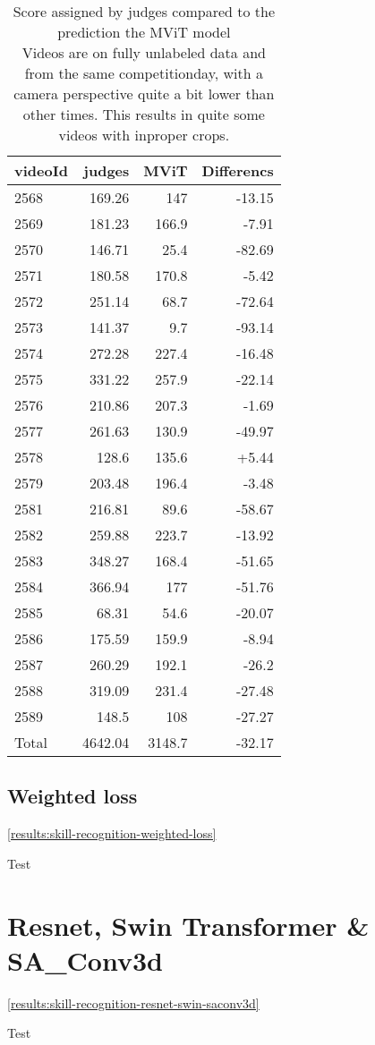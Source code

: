 \begin{table}[h!]
    \begin{tabular}{|l|r|r|r|}
        \hline
        videoId & judges    & MViT         & Differencs \\ \hline
        2568	& 169.26	&   147	       & -13.15 \\
        2569	& 181.23	&   166.9	   & -7.91  \\
        2570	& 146.71	&   25.4	   & -82.69 \\
        2571	& 180.58	&   170.8	   & -5.42  \\
        2572	& 251.14	&   68.7       & -72.64 \\
        2573	& 141.37	&   9.7	       & -93.14 \\
        2574	& 272.28	&   227.4	   & -16.48 \\
        2575	& 331.22	&   257.9	   & -22.14 \\
        2576	& 210.86	&   207.3	   & -1.69  \\
        2577	& 261.63	&   130.9	   & -49.97 \\
        2578	& 128.6	    &   135.6	   & +5.44  \\
        2579	& 203.48	&   196.4	   & -3.48  \\
        2581	& 216.81	&   89.6	   & -58.67 \\
        2582	& 259.88	&   223.7	   & -13.92 \\
        2583	& 348.27	&   168.4	   & -51.65 \\
        2584	& 366.94	&   177 	   & -51.76 \\
        2585	& 68.31	    &   54.6	   & -20.07 \\
        2586	& 175.59	&   159.9	   & -8.94  \\
        2587	& 260.29	&   192.1	   & -26.2  \\
        2588	& 319.09	&   231.4	   & -27.48 \\
        2589	& 148.5	    &   108 	   & -27.27 \\ \hline
        Total   & 4642.04	&   3148.7	   & -32.17 \\ \hline
    \end{tabular}
    \caption[judge diff score compared to MViT]{Score assigned by judges compared to the prediction the MViT model \\
    Videos are on fully unlabeled data and from the same competitionday, with a camera perspective quite a bit lower than other times.
    This results in quite some videos with inproper crops.}
    \label{tbl:judge-score-comparison}
\end{table}

\subsection{Weighted loss}
\ref{results:skill-recognition-weighted-loss}

Test

\section{Resnet, Swin Transformer \& SA\_Conv3d}
\ref{results:skill-recognition-resnet-swin-saconv3d}

Test
